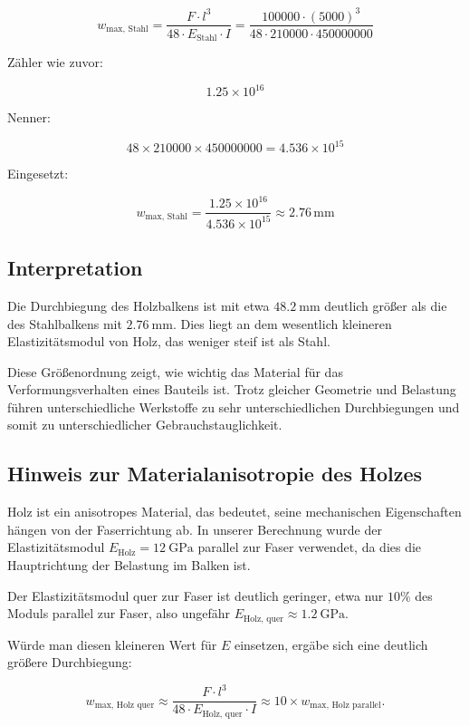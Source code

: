 \[
w_{\text{max, Stahl}} = \frac{F \cdot l^3}{48 \cdot E_{\text{Stahl}} \cdot I}
= \frac{100000 \cdot (5000)^3}{48 \cdot 210000 \cdot 450000000}
\]

Zähler wie zuvor:

\[
1.25 \times 10^{16}
\]

Nenner:

\[
48 \times 210000 \times 450000000 = 4.536 \times 10^{15}
\]

Eingesetzt:

\[
w_{\text{max, Stahl}} = \frac{1.25 \times 10^{16}}{4.536 \times 10^{15}} \approx 2.76\, \mathrm{mm}
\]

\subsection*{Interpretation}

Die Durchbiegung des Holzbalkens ist mit etwa \(\SI{48.2}{\milli\meter}\) deutlich größer als die des Stahlbalkens mit \(\SI{2.76}{\milli\meter}\). Dies liegt an dem wesentlich kleineren Elastizitätsmodul von Holz, das weniger steif ist als Stahl.

Diese Größenordnung zeigt, wie wichtig das Material für das Verformungsverhalten eines Bauteils ist. Trotz gleicher Geometrie und Belastung führen unterschiedliche Werkstoffe zu sehr unterschiedlichen Durchbiegungen und somit zu unterschiedlicher Gebrauchstauglichkeit.

\subsection*{Hinweis zur Materialanisotropie des Holzes}

Holz ist ein anisotropes Material, das bedeutet, seine mechanischen Eigenschaften hängen von der Faserrichtung ab. In unserer Berechnung wurde der Elastizitätsmodul \( E_{\text{Holz}} = \SI{12}{\giga\pascal} \) parallel zur Faser verwendet, da dies die Hauptrichtung der Belastung im Balken ist.

Der Elastizitätsmodul quer zur Faser ist deutlich geringer, etwa nur \(10\%\) des Moduls parallel zur Faser, also ungefähr \( E_{\text{Holz, quer}} \approx \SI{1.2}{\giga\pascal} \).

Würde man diesen kleineren Wert für \( E \) einsetzen, ergäbe sich eine deutlich größere Durchbiegung:

\[
w_{\text{max, Holz quer}} \approx \frac{F \cdot l^3}{48 \cdot E_{\text{Holz, quer}} \cdot I} \approx 10 \times w_{\text{max, Holz parallel}}.
\]

